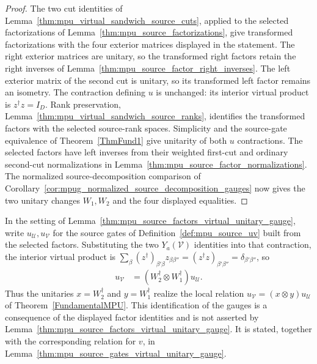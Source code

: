 \begin{proof}\leanok
    The two cut identities of
    Lemma~\ref{thm:mpu_virtual_sandwich_source_cuts}, applied to the
    selected factorizations of Lemma~\ref{thm:mpu_source_factorizations},
    give transformed factorizations with the four exterior matrices
    displayed in the statement. The right exterior matrices are unitary, so
    the transformed right factors retain the right inverses of
    Lemma~\ref{thm:mpu_source_factor_right_inverses}. The left exterior
    matrix of the second cut is unitary, so its transformed left factor
    remains an isometry. The contraction defining $u$ is unchanged: its
    interior virtual product is $z^\dagger z=I_D$. Rank preservation,
    Lemma~\ref{thm:mpu_virtual_sandwich_source_ranks}, identifies the
    transformed factors with the selected source-rank spaces. Simplicity and
    the source-gate equivalence of Theorem~\ref{ThmFund1} give unitarity of
    both $u$ contractions. The selected factors have left inverses from their
    weighted first-cut and ordinary second-cut normalizations in
    Lemma~\ref{thm:mpu_source_factor_normalizations}. The normalized
    source-decomposition comparison of
    Corollary~\ref{cor:mpug_normalized_source_decomposition_gauges} now
    gives the two unitary changes $W_1,W_2$ and the four displayed
    equalities.
\end{proof}

\begin{remark}
    In the setting of
    Lemma~\ref{thm:mpu_source_factors_virtual_unitary_gauge}, write
    $u_{\mathcal U},u_{\mathcal V}$ for the source gates of
    Definition~\ref{def:mpu_source_uv} built from the selected factors.
    Substituting the two $Y_a(\mathcal V)$ identities into that contraction,
    the interior virtual product is $\sum_\beta(z^\dagger)_{\beta'\beta}
        z_{\beta\beta''}=(z^\dagger z)_{\beta'\beta''}=\delta_{\beta'\beta''}$,
    so
    \begin{align}
        u_{\mathcal V} & =(W_2^\dagger\otimes W_1^\dagger)u_{\mathcal U}.
    \end{align}
    Thus the unitaries $x=W_2^\dagger$ and $y=W_1^\dagger$ realize the local
    relation $u_{\mathcal V}=(x\otimes y)u_{\mathcal U}$ of
    Theorem~\ref{FundamentalMPU}. This identification of the gauges is a
    consequence of the displayed factor identities and is not asserted by
    Lemma~\ref{thm:mpu_source_factors_virtual_unitary_gauge}. It is
    stated, together with the corresponding relation for $v$, in
    Lemma~\ref{thm:mpu_source_gates_virtual_unitary_gauge}.
\end{remark}

